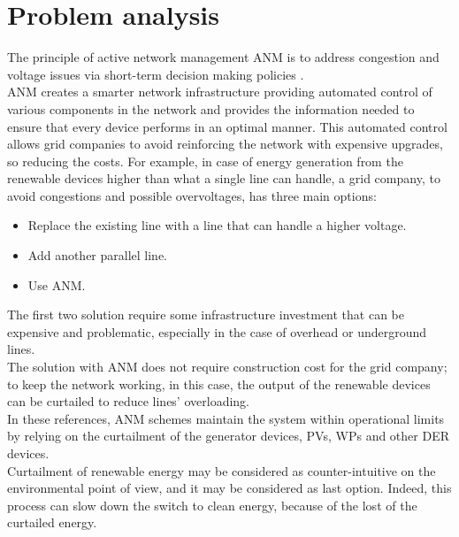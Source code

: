 \chapter{Problem analysis}
\label{chapter4}
The principle of active network management \gls{ANM} is to address congestion and voltage issues via short-term decision making policies \cite{ANMQuentin}. \\
\gls{ANM} creates a smarter network infrastructure providing automated control of various components in the network and provides the information needed to ensure that every device performs in an optimal manner. This automated control allows grid companies to avoid reinforcing the network with expensive upgrades, so reducing the costs.
For example, in case of energy generation from the renewable devices higher than what a single line can handle, a grid company, to avoid congestions and possible overvoltages, has three main options:
\begin{itemize}
    \item Replace the existing line with a line that can handle a higher voltage.
    \item Add another parallel line.
    \item Use \gls{ANM}.
\end{itemize}
The first two solution require some infrastructure investment that can be expensive and problematic, especially in the case of overhead or underground lines.\\
The solution with \gls{ANM} does not require construction cost for the grid company; to keep the network working, in this case, the output of the renewable devices can be curtailed to reduce lines' overloading. \\

In these references, \gls{ANM} schemes maintain the system within operational limits by relying on the curtailment of the generator devices, \glspl{PV}, \glspl{WP} and other \gls{DER} devices. \\
Curtailment of renewable energy may be considered as counter-intuitive on the environmental point of view, and it may be considered as last option. Indeed, this process can slow down the switch to clean energy, because of the lost of the curtailed energy. \\

